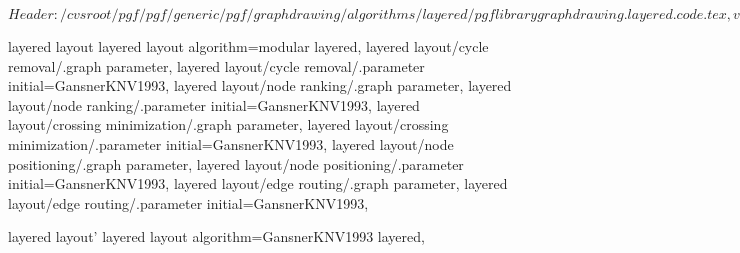 %
%
%

\ProvidesFileRCS[v\pgfversion] $Header: /cvsroot/pgf/pgf/generic/pgf/graphdrawing/algorithms/layered/pgflibrarygraphdrawing.layered.code.tex,v 1.7 2011/12/02 14:50:18 tantau Exp $






%
%




%
%
\pgfgddeclarealgorithmkey
  {layered layout}
  {layered layout}
  {
    algorithm=modular layered,
    layered layout/cycle removal/.graph parameter,
    layered layout/cycle removal/.parameter initial=GansnerKNV1993,
    layered layout/node ranking/.graph parameter,
    layered layout/node ranking/.parameter initial=GansnerKNV1993,
    layered layout/crossing minimization/.graph parameter,
    layered layout/crossing minimization/.parameter initial=GansnerKNV1993,
    layered layout/node positioning/.graph parameter,
    layered layout/node positioning/.parameter initial=GansnerKNV1993,
    layered layout/edge routing/.graph parameter,
    layered layout/edge routing/.parameter initial=GansnerKNV1993,
  }



%
%
%
\pgfgddeclarealgorithmkey
  {layered layout'}
  {layered layout}
  {
    algorithm=GansnerKNV1993 layered,
  }


\endinput
